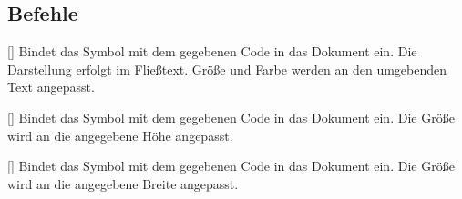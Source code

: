 \subsection{Befehle}
\begin{commands}
	[]
	Bindet das Symbol mit dem gegebenen Code in das Dokument ein.
	Die Darstellung erfolgt im Fließtext. Größe und Farbe werden an
	den umgebenden Text angepasst.
\begin{sidebyside}
  \Huge\color{yellow}
\end{sidebyside}
	[]
	Bindet das Symbol mit dem gegebenen Code in das Dokument ein.
	Die Größe wird an die angegebene Höhe angepasst.
\begin{sidebyside}
\end{sidebyside}
	[]
	Bindet das Symbol mit dem gegebenen Code in das Dokument ein.
	Die Größe wird an die angegebene Breite angepasst.
\begin{sidebyside}
\end{sidebyside}
\end{commands}